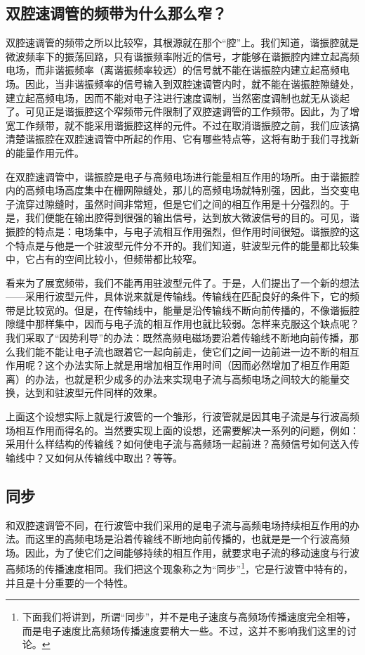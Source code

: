 \subsection{双腔速调管的频带为什么那么窄？}
双腔速调管的频带之所以比较窄，其根源就在那个“腔”上。我们知道，谐振腔就是微波频率下的振荡回路，只有谐振频率附近的信号，才能够在谐振腔内建立起高频电场，而非谐振频率（离谐振频率较远）的信号就不能在谐振腔内建立起高频电场。因此，当非谐振频率的信号输入到双腔速调管内时，就不能在谐振腔隙缝处，建立起高频电场，因而不能对电子注进行速度调制，当然密度调制也就无从谈起了。可见正是谐振腔这个窄频带元件限制了双腔速调管的工作频带。因此，为了增宽工作频带，就不能采用谐振腔这样的元件。不过在取消谐振腔之前，我们应该搞清楚谐振腔在双腔速调管中所起的作用、它有哪些特点等，这将有助于我们寻找新的能量作用元件。

在双腔速调管中，谐振腔是电子与高频电场进行能量相互作用的场所。由于谐振腔内的高频电场高度集中在栅网隙缝处，那儿的高频电场就特别强，因此，当交变电子流穿过隙缝时，虽然时间非常短，但是它们之间的相互作用是十分强烈的。于是，我们便能在输出腔得到很强的输出信号，达到放大微波信号的目的。可见，谐振腔的特点是：电场集中，与电子流相互作用强烈，但作用时间很短。谐振腔的这个特点是与他是一个驻波型元件分不开的。我们知道，驻波型元件的能量都比较集中，它占有的空间比较小，但频带都比较窄。

看来为了展宽频带，我们不能再用驻波型元件了。于是，人们提出了一个新的想法——采用行波型元件，具体说来就是传输线。传输线在匹配良好的条件下，它的频带是比较宽的。但是，在传输线中，能量是沿传输线不断向前传播的，不像谐振腔隙缝中那样集中，因而与电子流的相互作用也就比较弱。怎样来克服这个缺点呢？我们采取了“因势利导”的办法：既然高频电磁场要沿着传输线不断地向前传播，那么我们能不能让电子流也跟着它一起向前走，使它们之间一边前进一边不断的相互作用呢？这个办法实际上就是用增加相互作用时间（因而必然增加了相互作用距离）的办法，也就是积少成多的办法来实现电子流与高频电场之间较大的能量交换，达到和驻波型元件同样的效果。

上面这个设想实际上就是行波管的一个雏形，行波管就是因其电子流是与行波高频场相互作用而得名的。当然要实现上面的设想，还需要解决一系列的问题，例如：采用什么样结构的传输线？如何使电子流与高频场一起前进？高频信号如何送入传输线中？又如何从传输线中取出？等等。
\subsection{同步}
和双腔速调管不同，在行波管中我们采用的是电子流与高频电场持续相互作用的办法。而这里的高频电场是沿着传输线不断地向前传播的，也就是是一个行波高频场。因此，为了使它们之间能够持续的相互作用，就要求电子流的移动速度与行波高频场的传播速度相同。我们把这个现象称之为“同步”\footnote{下面我们将讲到，所谓“同步”，并不是电子速度与高频场传播速度完全相等，而是电子速度比高频场传播速度要稍大一些。不过，这并不影响我们这里的讨论。}，它是行波管中特有的，并且是十分重要的一个特性。

